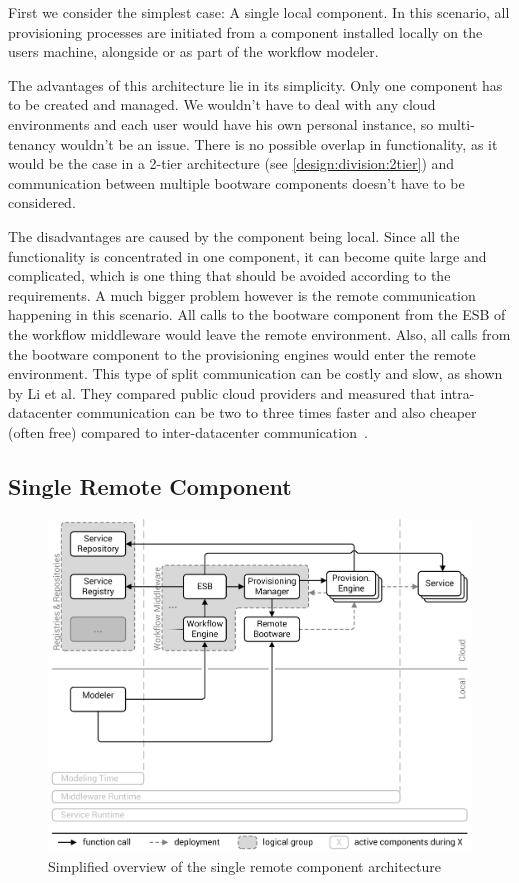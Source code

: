 First we consider the simplest case: A single local component.
In this scenario, all provisioning processes are initiated from a component installed locally on the users machine, alongside or as part of the workflow modeler.

The advantages of this architecture lie in its simplicity.
Only one component has to be created and managed.
We wouldn't have to deal with any cloud environments and each user would have his own personal instance, so multi-tenancy wouldn't be an issue.
There is no possible overlap in functionality, as it would be the case in a 2-tier architecture (see \autoref{design:division:2tier}) and communication between multiple bootware components doesn't have to be considered.

The disadvantages are caused by the component being local.
Since all the functionality is concentrated in one component, it can become quite large and complicated, which is one thing that should be avoided according to the requirements.
A much bigger problem however is the remote communication happening in this scenario.
All calls to the bootware component from the ESB of the workflow middleware would leave the remote environment.
Also, all calls from the bootware component to the provisioning engines would enter the remote environment.
This type of split communication can be costly and slow, as shown by Li et al.
They compared public cloud providers and measured that intra-datacenter communication can be two to three times faster and also cheaper (often free) compared to inter-datacenter communication~\autocite{cloudcmp}.

\subsection{Single Remote Component}

\begin{figure}[!htbp]
	\centering
	\includegraphics[resolution=600]{design/assets/remote}
	\caption{Simplified overview of the single remote component architecture}
	\label{image:remote}
\end{figure}

